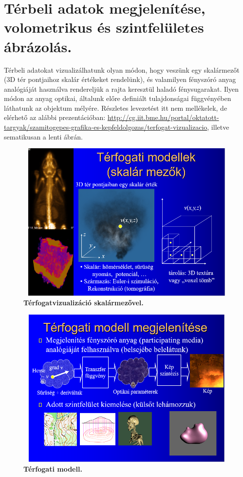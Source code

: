 \documentclass[12pt]{article}
\theoremstyle{plain}
\begin{document}
\section{Térbeli adatok megjelenítése, volometrikus és szintfelületes ábrázolás.}
Térbeli adatokat vizualizálhatunk olyan módon, hogy veszünk egy skalármezőt (3D tér pontjaihoz skalár értékeket rendelünk), és valamilyen fényszóró anyag analógiáját használva rendereljük a rajta keresztül haladó fénysugarakat. Ilyen módon az anyag optikai, általunk előre definiált tulajdonságai függvényében láthatunk az objektum mélyére. Részletes levezetést itt nem mellékelek, de elérhető az alábbi prezentációban: \url{http://cg.iit.bme.hu/portal/oktatott-targyak/szamitogepes-grafika-es-kepfeldolgozas/terfogat-vizualizacio}, illetve sematikusan a lenti ábrán.

\begin{figure}[H]
   \centering
   \includegraphics[width=12cm, height=8cm]{media/terf1.PNG}
   \caption{\textbf{Térfogatvizualizáció skalármezővel.}}
   \label{fig:GeneralDiagram}
\end{figure}

\begin{figure}[H]
   \centering
   \includegraphics[width=12cm, height=8cm]{media/terf2.PNG}
   \caption{\textbf{Térfogati modell.}}
   \label{fig:GeneralDiagram}
\end{figure}
\end{document}
